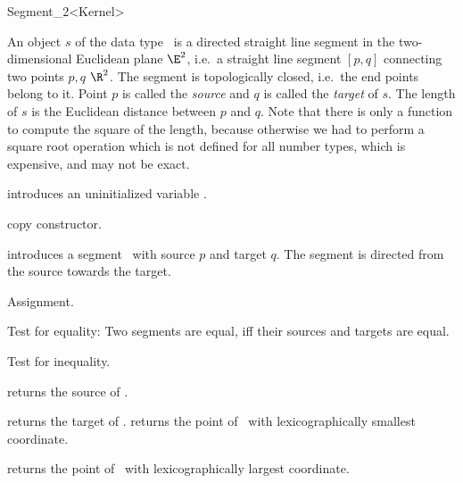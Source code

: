 \begin{ccRefClass} {Segment_2<Kernel>}


\ccDefinition  An object $s$ of the data type \ccRefName\ is a directed
straight line segment in the two-dimensional Euclidean plane $\E^2$, i.e.\ a
straight line segment $[p,q]$ connecting two points $p,q$ 
$\R^2$. The segment is topologically closed, i.e.\  the end
points belong to it. Point $p$ is called the {\em source} and $q$
is called the {\em target} of $s$. The length of $s$ is the
Euclidean distance between $p$ and $q$. Note that there is only a function
to compute the square of the length, because otherwise we had to
perform a square root operation which is not defined for all
number types, which is expensive, and may not be exact.

\ccCreation
{}


\ccHidden {}
             {introduces an uninitialized variable \ccVar.}

\ccHidden {}
            {copy constructor.}

            {introduces a segment \ccVar\ with source $p$
             and target $q$. The segment is directed from the source towards
             the target.}


\ccOperations

\ccHidden {}
        {Assignment.}

       {Test for equality: Two segments are equal, iff their sources and
        targets are equal.}

       {Test for inequality.}


       {returns the source of \ccVar.}

       {returns the target of \ccVar.}
\ccGlue
{}
       {returns the point of \ccVar\ with lexicographically smallest coordinate.}

       {returns the point of \ccVar\ with lexicographically largest coordinate.}



\end{ccRefClass}
